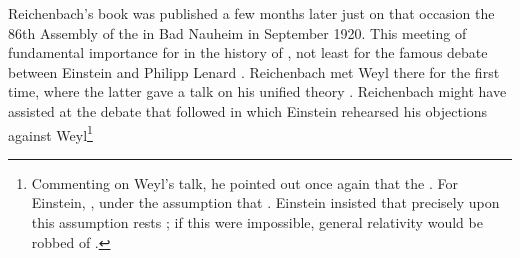 \documentclass[draft]{article}
\begin{document}
Reichenbach's book was published a few months later just on that occasion the 86th Assembly of the  in Bad Nauheim in September 1920. This meeting of fundamental importance for in the history of \rt, not least for the famous debate between Einstein and Philipp Lenard \citep{Dongen2007}. Reichenbach met Weyl there for the first time, where the latter gave a talk on his unified theory \citep{Weyl1920}. Reichenbach might have assisted at the debate that followed in which Einstein rehearsed his objections against Weyl\footnote{Commenting on Weyl's talk, he pointed out once again that the   \citep[650]{Einstein1920c}. For Einstein, , under the assumption that  \citep[650]{Einstein1920c}. Einstein insisted that precisely upon this assumption rests ; if this were impossible, general relativity would be robbed of  \citep[650]{Einstein1920c}.
}
\end{document}
